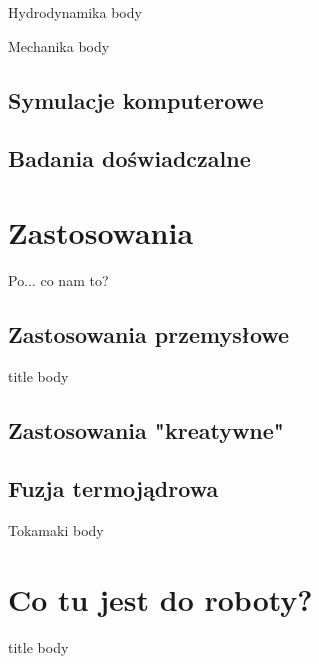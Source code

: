 \documentclass{beamer}
\begin{document}
\begin{frame}[t]{Hydrodynamika}
  body
\end{frame}

\begin{frame}[t]{Mechanika}
  body
\end{frame}

\subsection{Symulacje komputerowe}

\subsection{Badania doświadczalne}


\section{Zastosowania}
\begin{frame}[t]{Po... co nam to?}
\end{frame}

\subsection{Zastosowania przemysłowe}
\begin{frame}[t]{title}
  body
\end{frame}
\subsection{Zastosowania "kreatywne"}

\subsection{Fuzja termojądrowa}
\begin{frame}[t]{Tokamaki}
  body
\end{frame}



\section{Co tu jest do roboty?}
\begin{frame}[t]{title}
  body
\end{frame}
\end{document}
